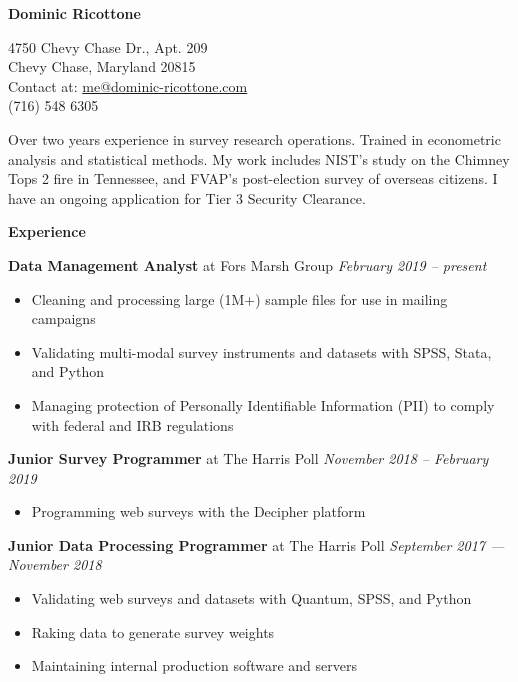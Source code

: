 \documentclass[12pt]{article}
\newenvironment{details}{
\begin{itemize}[label={}]
	\small \setlength{\itemsep}{0pt}
}{\end{itemize}}
\begin{document}
\centering \Huge
\textbf{Dominic Ricottone}

\footnotesize
\begin{multicols}{2}
4750 Chevy Chase Dr., Apt. 209 \\
Chevy Chase, Maryland 20815 \\
Contact at: \href{mailto:me@dominic-ricottone.com}{me@dominic-ricottone.com} \\
(716) 548 6305
\end{multicols}

\vspace{.1in}
\normalsize
\begin{flushleft}
Over two years experience in survey research operations. Trained in econometric 
analysis and statistical methods. My work includes NIST's study on the Chimney 
Tops 2 fire in Tennessee, and FVAP's post-election survey of overseas citizens. 
I have an ongoing application for Tier 3 Security Clearance.
\end{flushleft}

\vspace{.1in}
\large
\textbf{Experience} \hrulefill
\vspace{.05in}

\normalsize
\textbf{Data Management Analyst} at Fors Marsh Group \hfill \textit{February 2019 -- present}
\begin{details}
 	\item Cleaning and processing large (1M+) sample files for use in mailing campaigns
	\item Validating multi-modal survey instruments and datasets with SPSS, Stata, and Python
	\item Managing protection of Personally Identifiable Information (PII) to comply with federal and IRB regulations
\end{details}

\normalsize
\textbf{Junior Survey Programmer} at The Harris Poll \hfill \textit{November 2018 -- February 2019}
\begin{details}
 	\item Programming web surveys with the Decipher platform
\end{details}

\normalsize
\textbf{Junior Data Processing Programmer} at The Harris Poll \hfill \textit{September 2017 --- November 2018}
\begin{details}
	\item Validating web surveys and datasets with Quantum, SPSS, and Python
 	\item Raking data to generate survey weights
	\item Maintaining internal production software and servers
\end{details}
\end{document}
